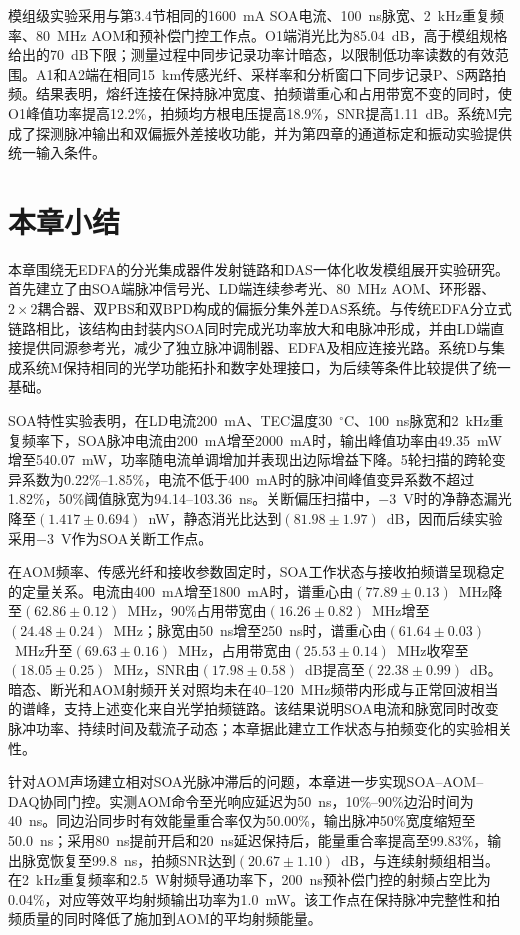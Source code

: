 模组级实验采用与第3.4节相同的1600~mA SOA电流、100~ns脉宽、2~kHz重复频率、80~MHz AOM和预补偿门控工作点。O1端消光比为85.04~dB，高于模组规格给出的70~dB下限；测量过程中同步记录功率计暗态，以限制低功率读数的有效范围。A1和A2端在相同15~km传感光纤、采样率和分析窗口下同步记录P、S两路拍频。结果表明，熔纤连接在保持脉冲宽度、拍频谱重心和占用带宽不变的同时，使O1峰值功率提高12.2\%，拍频均方根电压提高18.9\%，SNR提高1.11~dB。系统M完成了探测脉冲输出和双偏振外差接收功能，并为第四章的通道标定和振动实验提供统一输入条件。

\section{本章小结}

本章围绕无EDFA的分光集成器件发射链路和DAS一体化收发模组展开实验研究。首先建立了由SOA端脉冲信号光、LD端连续参考光、80~MHz AOM、环形器、$2\times2$耦合器、双PBS和双BPD构成的偏振分集外差DAS系统。与传统EDFA分立式链路相比，该结构由封装内SOA同时完成光功率放大和电脉冲形成，并由LD端直接提供同源参考光，减少了独立脉冲调制器、EDFA及相应连接光路。系统D与集成系统M保持相同的光学功能拓扑和数字处理接口，为后续等条件比较提供了统一基础。

SOA特性实验表明，在LD电流200~mA、TEC温度30~$^\circ$C、100~ns脉宽和2~kHz重复频率下，SOA脉冲电流由200~mA增至2000~mA时，输出峰值功率由49.35~mW增至540.07~mW，功率随电流单调增加并表现出边际增益下降。5轮扫描的跨轮变异系数为0.22\%--1.85\%，电流不低于400~mA时的脉冲间峰值变异系数不超过1.82\%，50\%阈值脉宽为94.14--103.36~ns。关断偏压扫描中，$-3$~V时的净静态漏光降至$(1.417\pm0.694)$~nW，静态消光比达到$(81.98\pm1.97)$~dB，因而后续实验采用$-3$~V作为SOA关断工作点。

在AOM频率、传感光纤和接收参数固定时，SOA工作状态与接收拍频谱呈现稳定的定量关系。电流由400~mA增至1800~mA时，谱重心由$(77.89\pm0.13)$~MHz降至$(62.86\pm0.12)$~MHz，90\%占用带宽由$(16.26\pm0.82)$~MHz增至$(24.48\pm0.24)$~MHz；脉宽由50~ns增至250~ns时，谱重心由$(61.64\pm0.03)$~MHz升至$(69.63\pm0.16)$~MHz，占用带宽由$(25.53\pm0.14)$~MHz收窄至$(18.05\pm0.25)$~MHz，SNR由$(17.98\pm0.58)$~dB提高至$(22.38\pm0.99)$~dB。暗态、断光和AOM射频开关对照均未在40--120~MHz频带内形成与正常回波相当的谱峰，支持上述变化来自光学拍频链路。该结果说明SOA电流和脉宽同时改变脉冲功率、持续时间及载流子动态；本章据此建立工作状态与拍频变化的实验相关性。

针对AOM声场建立相对SOA光脉冲滞后的问题，本章进一步实现SOA--AOM--DAQ协同门控。实测AOM命令至光响应延迟为50~ns，10\%--90\%边沿时间为40~ns。同边沿同步时有效能量重合率仅为50.00\%，输出脉冲50\%宽度缩短至50.0~ns；采用80~ns提前开启和20~ns延迟保持后，能量重合率提高至99.83\%，输出脉宽恢复至99.8~ns，拍频SNR达到$(20.67\pm1.10)$~dB，与连续射频组相当。在2~kHz重复频率和2.5~W射频导通功率下，200~ns预补偿门控的射频占空比为0.04\%，对应等效平均射频输出功率为1.0~mW。该工作点在保持脉冲完整性和拍频质量的同时降低了施加到AOM的平均射频能量。

